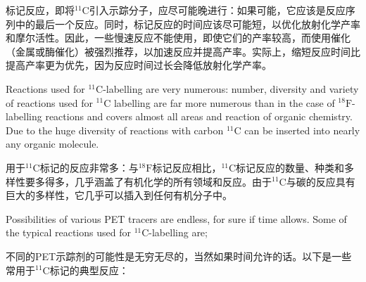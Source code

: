\documentclass[dvipsnames, svgnames,a4paper,11pt]{article}
\begin{document}
标记反应，即将${}^\mathrm{11}\mathrm{C}$引入示踪分子，应尽可能晚进行：如果可能，它应该是反应序列中的最后一个反应。同时，标记反应的时间应该尽可能短，以优化放射化学产率和摩尔活性。因此，一些慢速反应不能使用，即使它们的产率较高，而使用催化（金属或酶催化）被强烈推荐，以加速反应并提高产率。实际上，缩短反应时间比提高产率更为优先，因为反应时间过长会降低放射化学产率。

Reactions used for ${}^\mathrm{11}\mathrm{C}$-labelling are very numerous: number, diversity and variety of reactions used for ${}^\mathrm{11}\mathrm{C}$ labelling are far more numerous than in the case of ${}^\mathrm{18}\mathrm{F}$-labelling reactions and covers almost all areas and reaction of organic chemistry. Due to the huge diversity of reactions with carbon ${}^\mathrm{11}\mathrm{C}$ can be inserted into nearly any organic molecule.

用于${}^\mathrm{11}\mathrm{C}$标记的反应非常多：与${}^\mathrm{18}\mathrm{F}$标记反应相比，${}^\mathrm{11}\mathrm{C}$标记反应的数量、种类和多样性要多得多，几乎涵盖了有机化学的所有领域和反应。由于${}^\mathrm{11}\mathrm{C}$与碳的反应具有巨大的多样性，它几乎可以插入到任何有机分子中。

Possibilities of various PET tracers are endless, for sure if time allows. Some of the typical reactions used for ${}^\mathrm{11}\mathrm{C}$-labelling are;

不同的PET示踪剂的可能性是无穷无尽的，当然如果时间允许的话。以下是一些常用于${}^\mathrm{11}\mathrm{C}$标记的典型反应：
\end{document}
